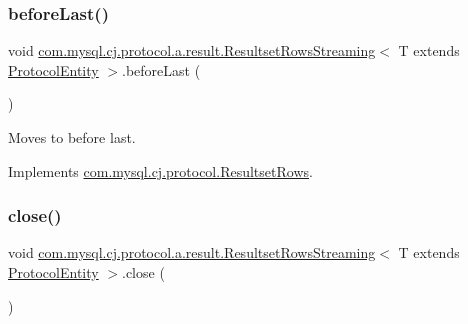 \mbox{\label{classcom_1_1mysql_1_1cj_1_1protocol_1_1a_1_1result_1_1_resultset_rows_streaming_a11ccbda4e0c40207c02253c5a2931748}} 
\subsubsection{\texorpdfstring{before\+Last()}{beforeLast()}}
{\footnotesize\ttfamily void \mbox{\hyperlink{classcom_1_1mysql_1_1cj_1_1protocol_1_1a_1_1result_1_1_resultset_rows_streaming}{com.\+mysql.\+cj.\+protocol.\+a.\+result.\+Resultset\+Rows\+Streaming}}$<$ T extends \mbox{\hyperlink{interfacecom_1_1mysql_1_1cj_1_1protocol_1_1_protocol_entity}{Protocol\+Entity}} $>$.before\+Last (\begin{DoxyParamCaption}{ }\end{DoxyParamCaption})}

Moves to before last. 

Implements \mbox{\hyperlink{interfacecom_1_1mysql_1_1cj_1_1protocol_1_1_resultset_rows_a5e79d9c2bb5bcfb947e02b71121d74d2}{com.\+mysql.\+cj.\+protocol.\+Resultset\+Rows}}.

\mbox{\label{classcom_1_1mysql_1_1cj_1_1protocol_1_1a_1_1result_1_1_resultset_rows_streaming_ae16b87b06548b980f3b0e3d9df020296}} 
\subsubsection{\texorpdfstring{close()}{close()}}
{\footnotesize\ttfamily void \mbox{\hyperlink{classcom_1_1mysql_1_1cj_1_1protocol_1_1a_1_1result_1_1_resultset_rows_streaming}{com.\+mysql.\+cj.\+protocol.\+a.\+result.\+Resultset\+Rows\+Streaming}}$<$ T extends \mbox{\hyperlink{interfacecom_1_1mysql_1_1cj_1_1protocol_1_1_protocol_entity}{Protocol\+Entity}} $>$.close (\begin{DoxyParamCaption}{ }\end{DoxyParamCaption})}

